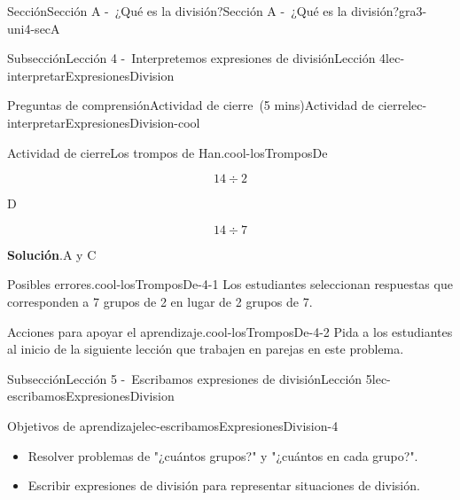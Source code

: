 \documentclass[oneside,10pt,]{article}
\newcommand{\blocktitlefont}{\relax}
\begin{document}
\begin{sectionptx}{Sección}{Sección A -~¿Qué es la división?}{}{Sección A -~¿Qué es la división?}{}{}{gra3-uni4-secA}
\begin{subsectionptx}{Subsección}{Lección 4 -~Interpretemos expresiones de división}{}{Lección 4}{}{}{lec-interpretarExpresionesDivision}
\begin{reading-questions-subsubsection}{Preguntas de comprensión}{Actividad de cierre~(5 mins)}{}{Actividad de cierre}{}{}{lec-interpretarExpresionesDivision-cool}
\begin{project}{Actividad de cierre}{Los trompos de Han.}{cool-losTromposDe}
\begin{sidebyside}{4}{0.0075}{0.0075}{0.015}
\begin{sbspanel}{0.43}%
\par
%
\begin{equation*}
14\div 2
\end{equation*}
%
\end{sbspanel}%
\begin{sbspanel}{0.04}%
\par
D%
\end{sbspanel}%
\begin{sbspanel}{0.43}%
\par
%
\begin{equation*}
14\div 7
\end{equation*}
%
\end{sbspanel}%
\end{sidebyside}%
\par\smallskip%
\noindent\textbf{\blocktitlefont Solución}.\hypertarget{cool-losTromposDe-3}{}\quad{}A y C%
\end{project}%
\par
\begin{paragraphs}{Posibles errores.}{cool-losTromposDe-4-1}%
Los estudiantes seleccionan respuestas que corresponden a 7 grupos de 2 en lugar de 2 grupos de 7.%
\end{paragraphs}%
\begin{paragraphs}{Acciones para apoyar el aprendizaje.}{cool-losTromposDe-4-2}%
Pida a los estudiantes al inicio de la siguiente lección que trabajen en parejas en este problema.%
\end{paragraphs}%
\end{reading-questions-subsubsection}
\end{subsectionptx}
%
%
\typeout{************************************************}
\typeout{************************************************}
%
\begin{subsectionptx}{Subsección}{Lección 5 -~Escribamos expresiones de división}{}{Lección 5}{}{}{lec-escribamosExpresionesDivision}
\begin{objectives}{Objetivos de aprendizaje}{lec-escribamosExpresionesDivision-4}
%
\begin{itemize}[label=\textbullet]
\item{}Resolver problemas de "¿cuántos grupos?" y "¿cuántos en cada grupo?".%
\item{}Escribir expresiones de división para representar situaciones de división.%
\end{itemize}
\end{objectives}

\end{subsectionptx}
\end{sectionptx}
\end{document}
